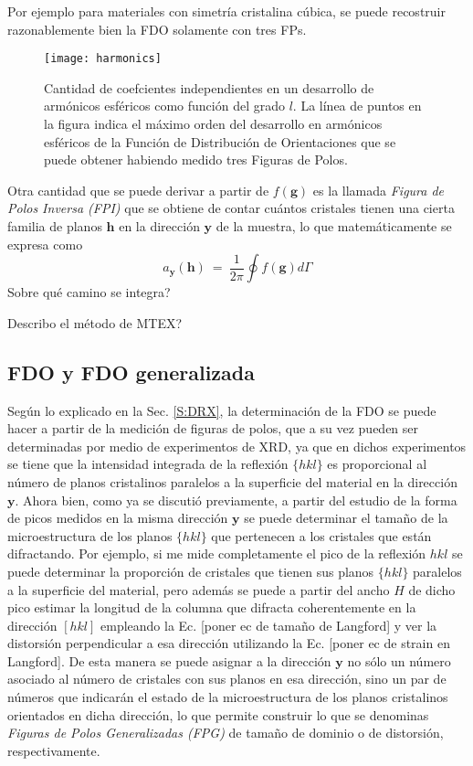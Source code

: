 Por ejemplo para materiales con simetría cristalina cúbica, se puede recostruir razonablemente bien la FDO solamente con tres FPs.
\begin{figure}[!htb]
  \centering
  \texttt{[image: harmonics]}
  \caption{Cantidad de coefcientes independientes en un desarrollo de armónicos esféricos como función del grado $l$. La línea de puntos en la figura indica el máximo orden del desarrollo en armónicos esféricos de la Función de Distribución de Orientaciones que se puede obtener habiendo medido tres Figuras de Polos.}
  \label{fig:harmonics}
\end{figure}

Otra cantidad que se puede derivar a partir de $f(\mathbf{g})$ es la llamada \textit{Figura de Polos Inversa (FPI)} que se obtiene de contar cuántos cristales tienen una cierta familia de planos $\mathbf{h}$ en la dirección $\mathbf{y}$ de la muestra, lo que matemáticamente se expresa como
\begin{equation}
  a_{\mathbf{y}}(\mathbf{h}) \ = \ \frac{1}{2 \pi} \oint f(\mathbf{g}) d\Gamma
  \label{eq:IPF}
\end{equation}
\noindent
Sobre qué camino se integra?

Describo el método de MTEX?
\subsection{FDO y FDO generalizada}\label{SS:ODFG}
Según lo explicado en la Sec. \ref{S:DRX}, la determinación de la FDO se puede hacer a partir de la medición de figuras de polos, que a su vez pueden ser determinadas por medio de experimentos de XRD, ya que en dichos experimentos se tiene que la intensidad integrada de la reflexión $\{hkl\}$ es proporcional al número de planos cristalinos paralelos a  la superficie del material en la dirección $\mathbf{y}$.
Ahora bien, como ya se discutió previamente, a partir del estudio de la forma de picos medidos en la misma dirección $\mathbf{y}$ se puede determinar el tamaño de la microestructura de los planos $\{hkl\}$ que pertenecen a los cristales que están difractando.
Por ejemplo, si me mide completamente el pico de la reflexión $hkl$ se puede determinar la proporción de cristales que tienen sus planos $\{hkl\}$ paralelos a la superficie del material, pero además se puede a partir del ancho $H$ de dicho pico estimar la longitud de la columna que difracta coherentemente en la dirección $[hkl]$ empleando la Ec. [poner ec de tamaño de Langford] y ver la distorsión perpendicular a esa dirección utilizando la Ec. [poner ec de strain en Langford].
De esta manera se puede asignar a la dirección $\mathbf{y}$ no sólo un número asociado al número de cristales con sus planos en esa dirección, sino un par de números que indicarán el estado de la microestructura de los planos cristalinos orientados en dicha dirección, lo que permite construir lo que se denominas \textit{Figuras de Polos Generalizadas (FPG)} de tamaño de dominio o de distorsión, respectivamente.

